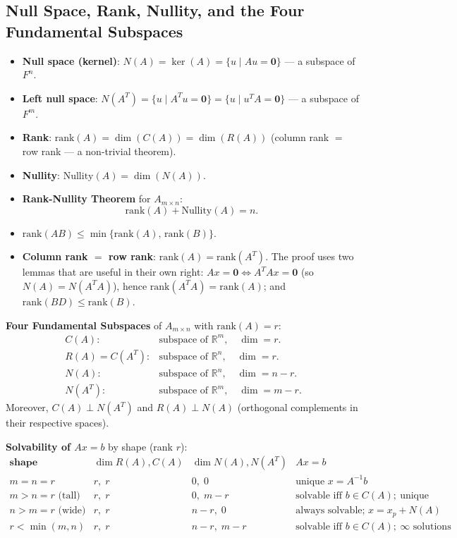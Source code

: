 \documentclass[hidelinks]{article}
\begin{document}
\subsection{Null Space, Rank, Nullity, and the Four Fundamental Subspaces}
\begin{itemize}
    \item \textbf{Null space (kernel)}: $N(A) = \ker(A) = \{u \mid Au = \mathbf{0}\}$ — a subspace of $F^n$.
    \item \textbf{Left null space}: $N(A^T) = \{u \mid A^T u = \mathbf{0}\} = \{u \mid u^T A = \mathbf{0}\}$ — a subspace of $F^m$.
    \item \textbf{Rank}: $\mathrm{rank}(A) = \dim(C(A)) = \dim(R(A))$ \quad (column rank $=$ row rank — a non-trivial theorem).
    \item \textbf{Nullity}: $\mathrm{Nullity}(A) = \dim(N(A))$.
    \item \textbf{Rank-Nullity Theorem} for $A_{m\times n}$:
    \[
        \mathrm{rank}(A) + \mathrm{Nullity}(A) = n.
    \]
    \item $\mathrm{rank}(AB) \leq \min\{\mathrm{rank}(A),\, \mathrm{rank}(B)\}$.
    \item \textbf{Column rank $=$ row rank}: $\mathrm{rank}(A) = \mathrm{rank}(A^T)$. The proof uses two lemmas that are useful in their own right: $Ax = \mathbf 0 \iff A^TAx = \mathbf 0$ (so $N(A) = N(A^TA)$), hence $\mathrm{rank}(A^TA) = \mathrm{rank}(A)$; and $\mathrm{rank}(BD) \le \mathrm{rank}(B)$.
\end{itemize}
\textbf{Four Fundamental Subspaces} of $A_{m\times n}$ with $\mathrm{rank}(A) = r$:
\[
\begin{array}{ll}
    C(A): & \text{subspace of } \mathbb{R}^m,\quad \dim = r.\\
    R(A) = C(A^T): & \text{subspace of } \mathbb{R}^n,\quad \dim = r.\\
    N(A): & \text{subspace of } \mathbb{R}^n,\quad \dim = n-r.\\
    N(A^T): & \text{subspace of } \mathbb{R}^m,\quad \dim = m-r.
\end{array}
\]
Moreover, $C(A) \perp N(A^T)$ and $R(A) \perp N(A)$ (orthogonal complements in their respective spaces).

\textbf{Solvability of $Ax=b$} by shape (rank $r$):
\[
\begin{array}{llll}
    \textbf{shape} & \dim R(A),C(A) & \dim N(A),N(A^T) & Ax=b\\[2pt]
    m=n=r & r,\; r & 0,\; 0 & \text{unique } x = A^{-1}b\\
    m>n=r \text{ (tall)} & r,\; r & 0,\; m-r & \text{solvable iff } b\in C(A);\ \text{unique}\\
    n>m=r \text{ (wide)} & r,\; r & n-r,\; 0 & \text{always solvable; } x = x_p + N(A)\\
    r<\min(m,n) & r,\; r & n-r,\; m-r & \text{solvable iff } b\in C(A);\ \infty\text{ solutions}
\end{array}
\]
\end{document}

